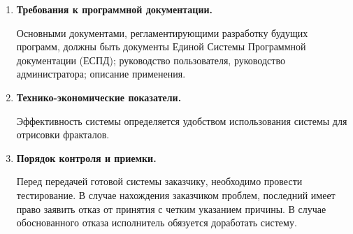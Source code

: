 \documentclass[a4paper,12pt,preview]{report} %
\renewcommand{\theenumi}{\arabic{enumi}}%
\renewcommand{\labelenumi}{\arabic{enumi}}%
\newenvironment{boenumerate}
{\begin{enumerate}\renewcommand\labelenumi{\textbf\theenumi}}
	{\end{enumerate}}
\begin{document}
\begin{boenumerate}
\begin{enumerate}
		\item Специальные требования.
		
		Программное обеспечение должно иметь дружественный интерфейс, рассчитанный на пользователя средней квалификации (по уровню компьютерной грамотности).
		
		Ввиду объемности проекта задачи предполагается решать поэтапно, при этом модули ПО, созданные в разное время, должны предполагать возможность наращивания системы и быть совместимы друг с другом, поэтому документация на принятое эксплуатационное ПО должна содержать полную информацию, необходимую для работы программистов с ним.
		
		Язык программирования – по выбору исполнителя, должен обеспечивать возможность интеграции программного обеспечения с некоторыми видами периферийного оборудования.
		
		\end{enumerate}
		
	\item \textbf{Требования к программной документации.}
	
	Основными документами, регламентирующими разработку будущих программ, должны быть документы Единой Системы Программной документации (ЕСПД); руководство пользователя, руководство администратора; описание применения.
	
	\item \textbf{Технико-экономические показатели.}
	
	Эффективность системы определяется удобством использования системы для отрисовки фракталов.
	
	\item \textbf{Порядок контроля и приемки.}
	
	Перед передачей готовой системы заказчику, необходимо провести тестирование. В случае нахождения заказчиком проблем, последний имеет право заявить отказ от принятия с четким указанием причины. В случае обоснованного отказа исполнитель обязуется доработать систему.
	
	
	
	\end{boenumerate}
	
	
\end{document}
